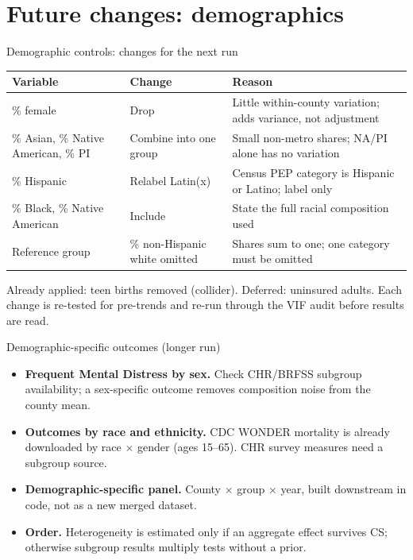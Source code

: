 \documentclass[aspectratio=169]{beamer}
\begin{document}
\section{Future changes: demographics}

\begin{frame}{Demographic controls: changes for the next run}
\vspace{-4pt}
\begin{center}\scriptsize
\begin{tabular}{@{}p{3.6cm}p{3.4cm}p{6.2cm}@{}}
\toprule
Variable & Change & Reason \\
\midrule
\% female & Drop & Little within-county variation; adds variance, not adjustment \\
\% Asian, \% Native American, \% PI & Combine into one group & Small non-metro shares; NA/PI alone has no variation \\
\% Hispanic & Relabel Latin(x) & Census PEP category is Hispanic or Latino; label only \\
\% Black, \% Native American & Include & State the full racial composition used \\
Reference group & \% non-Hispanic white omitted & Shares sum to one; one category must be omitted \\
\bottomrule
\end{tabular}
\end{center}
\vspace{0.3em}
{\footnotesize Already applied: teen births removed (collider). Deferred: uninsured adults. Each change is re-tested for pre-trends and re-run through the VIF audit before results are read.}
\end{frame}

\begin{frame}{Demographic-specific outcomes (longer run)}
\begin{itemize}\footnotesize
  \item \textbf{Frequent Mental Distress by sex.} Check CHR/BRFSS subgroup availability; a sex-specific outcome removes composition noise from the county mean.
  \item \textbf{Outcomes by race and ethnicity.} CDC WONDER mortality is already downloaded by race $\times$ gender (ages 15--65). CHR survey measures need a subgroup source.
  \item \textbf{Demographic-specific panel.} County $\times$ group $\times$ year, built downstream in code, not as a new merged dataset.
  \item \textbf{Order.} Heterogeneity is estimated only if an aggregate effect survives CS; otherwise subgroup results multiply tests without a prior.
\end{itemize}
\end{frame}
\end{document}
